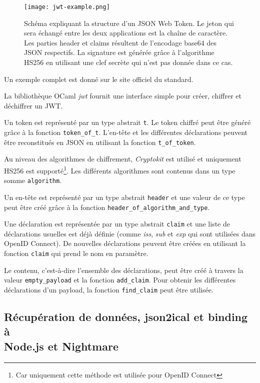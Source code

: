 \begin{figure}
  \centering
  \texttt{[image: jwt-example.png]}
  \caption{Schéma expliquant la structure d'un JSON Web Token. Le jeton qui sera
    échangé entre les deux applications est la chaîne de caractère. Les parties header
    et claims résultent de l'encodage base64 des JSON respectifs. La signature
    est générée grâce à l'algorithme HS256 en utilisant une clef secrète qui
    n'est pas donnée dans ce cas.}
\end{figure}

Un exemple complet est donné sur le site officiel du standard\cite{official-jwt-website}.

La bibliothèque OCaml \emph{jwt}\cite{ocaml-jwt-github} fournit une interface
simple pour créer, chiffrer et déchiffrer un JWT.

Un token est représenté par un type abstrait \verb|t|. Le token chiffré peut
être généré grâce à la fonction \verb|token_of_t|. L'en-tête et les différentes
déclarations peuvent être reconstitués en JSON en utilisant la fonction
\verb|t_of_token|.

Au niveau des algorithmes de chiffrement,
\textit{Cryptokit}\cite{ocaml-cryptokit-ocaml-forge} est utilisé et uniquement
HS256 est supporté\footnote{Car uniquement cette méthode est utilisée pour OpenID
  Connect}. Les différents algorithmes sont contenus dans un type somme \verb|algorithm|.

Un en-tête  est représenté par un type abstrait \verb|header| et une valeur de ce
type peut être créé grâce à la fonction \verb|header_of_algorithm_and_type|.

Une déclaration est représentée par un type abstrait \verb|claim| et une liste de
déclarations usuelles est déjà définie (comme \emph{iss}, \emph{sub} et \emph{exp} qui
sont utilisées dans OpenID Connect). De nouvelles déclarations peuvent être
créées en utilisant la fonction \verb|claim| qui prend le nom en paramètre.

Le contenu, c'est-à-dire l'ensemble des déclarations, peut être créé à travers la
valeur \verb|empty_payload| et la fonction \verb|add_claim|.
Pour obtenir les différentes déclarations d'un payload, la fonction \verb|find_claim|
peut être utilisée.

\subsection{Récupération de données, json2ical et binding à \\ Node.js  et Nightmare}

